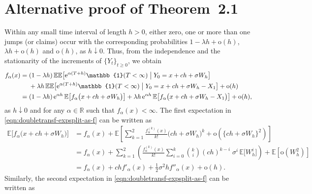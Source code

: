 \documentclass[final]{article}
\makeatletter
\newcommand*{\1}{\mathbb{1}}
\newcommand*{\E}{\mathbb{E}}
\newcommand*{\R}{\mathbb{R}}
\newcommand*{\e}{\mathrm{e}}
\newcommand*{\oh}{\mathrm{o}}
\newcommand*{\shift}{\ensuremath{\mathrel{\phantom{=}}\strut}}
\renewenvironment{proof}[1][\proofname]{\par\pushQED{\qed}\normalfont\topsep6\p@\@plus6\p@\relax\trivlist\item[\hskip\labelsep\bfseries#1\@addpunct{.}]\ignorespaces}{\popQED\endtrivlist\@endpefalse}
\makeatother
\begin{document}
\section*{Alternative proof of Theorem~2.1}
\begin{proof}[Proof of Theorem~2.1]
    Within any small time interval of length $h > 0$, either zero, one or more than one
    jumps (or claims) occur with the corresponding probabilities $1 - \lambda h + \oh(h)$,
    $\lambda h + \oh(h)$ and $\oh(h)$, as $h \downarrow 0$.  Thus, from the independence
    and the stationarity of the increments of $\{Y_{t}\}_{t \ge 0}$, we obtain
    \begin{align}
        f_{\alpha}(x)
            &= (1 - \lambda h)\,\E\E\bigl[\e^{\alpha(T + h)} \1(T < \infty) \bigm| Y_{0} = x + ch + \sigma W_{h}\bigr] \nonumber \\
                &\shift + \lambda h\,\E\E\bigl[\e^{\alpha(T + h)} \1(T < \infty) \bigm| Y_{0} = x + ch + \sigma W_{h} - X_{1}\bigr]
                        + \oh(h) \nonumber \\
            &= (1 - \lambda h)\,\e^{\alpha h}\,\E\bigl[f_{\alpha}\bigl(x + ch + \sigma W_{h}\bigr)\bigr]
                + \lambda h\,\e^{\alpha h}\,\E\bigl[f_{\alpha}\bigl(x + ch + \sigma W_{h} - X_{1}\bigr)\bigr]
                + \oh(h),
    \label{eqn:doubletransf-expsplit-as-f}
    \end{align}
    as $h \downarrow 0$ and for any $\alpha \in \R$ such that $f_\alpha(x) < \infty$.  The
    first expectation in \eqref{eqn:doubletransf-expsplit-as-f} can be written as
    \begin{align}
        \E\bigl[f_{\alpha}\bigl(x + ch + \sigma W_{h}\bigr)\bigr]
            &= f_{\alpha}(x) + \E\left[\sum_{k=1}^{2}
        \frac{f_{\alpha}^{(k)}(x)}{k!}\bigl(ch + \sigma W_{h}\bigr)^{k} + \oh \left( \{ c h + \sigma W_h \}^2
                                        \right) \right]  \nonumber\\
            &= f_{\alpha}(x) + \sum_{k=1}^{2} \left(\frac{f_{\alpha}^{(k)}(x)}{k!} \sum_{i=0}^{k} \binom{k}{i} (ch)^{k-i}\;\sigma^{i}\,\E\bigl[W_{h}^{i}\bigr]\right) + \E\left[ \oh \left( W_h^2 \right) \right] \nonumber\\
            &= f_{\alpha}(x) + ch f'_{\alpha}(x) + \tfrac{1}{2}\sigma^{2}h f''_{\alpha}(x) + \oh(h).
    \label{eqn:doubletransf-exp-taylor-one}
    \end{align}
    Similarly, the second expectation in \eqref{eqn:doubletransf-expsplit-as-f} can be
    written as
    \begin{align}

\end{align}
\end{proof}
\end{document}
